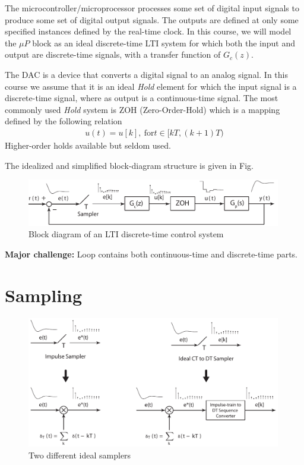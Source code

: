 \documentclass[twoside]{article}
\begin{document}
The microcontroller/microprocessor processes some set of digital input signals
to produce some set of digital output signals. The outputs are defined
at only some specified instances defined by the real-time clock. In this
course, we will model the $\mu P$ block as an ideal discrete-time LTI
system for which both the input and output are discrete-time
signals, with a transfer function of $G_c(z)$.

The DAC is a device that converts a digital signal to an analog
signal. In this course we assume that it is an ideal \textit{Hold}
element for which the input signal is a discrete-time signal, where as
output is a continuous-time signal. The most commonly used
\textit{Hold} system is ZOH (Zero-Order-Hold) which is a mapping 
defined by the following relation
%
\begin{align*}
  u(t) = u[k] , \ \mathrm{for} t \in [kT , (k+1)T )
\end{align*}
%
Higher-order holds available but seldom used.

The idealized and simplified block-diagram structure is given in Fig.

\begin{figure}[h]
    \centering
      \includegraphics[width=0.99\textwidth]{idealblock}
    \caption{Block diagram of an LTI discrete-time control system}
    \label{fig:introblock}
\end{figure}

\textbf{Major challenge:} Loop contains both continuous-time and discrete-time parts.

\section*{Sampling}

\begin{figure}[h]
    \centering
      \includegraphics[width=0.99\textwidth]{sampling}
    \caption{Two different ideal samplers}
    \label{fig:sampling}
\end{figure}
\end{document}
